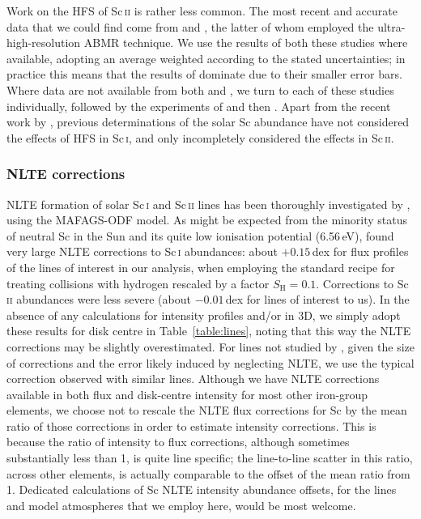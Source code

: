 \documentclass[traditabstract]{aa}
\newcommand{\altsci}{Sc\,\textsc{i}}
\newcommand{\altscii}{Sc\,\textsc{ii}}
\begin{document}
Work on the HFS of Sc\,\textsc{ii} is rather less common.  The most recent and accurate data that we could find come from
\citet{Villemoes92} and \citet{Mansour89}, the latter of whom employed the ultra-high-resolution ABMR technique.
We use the results of both these studies where available, adopting an average weighted according to the stated
uncertainties; in practice this means that the results of \citet{Mansour89} dominate due to their smaller error
 bars.  Where data are not available from both \citet{Villemoes92} and \citet{Mansour89}, we turn to each of these studies individually, followed by the experiments of \citet{Young88} and then \citet{Arnesen82}.  Apart from
the recent work by \citet{Zhang08}, previous determinations of the solar Sc abundance have not considered 
the effects of HFS in \altsci, and only incompletely considered the effects in \altscii.

\subsubsection{NLTE corrections}
\label{ScNLTE}

NLTE formation of solar Sc\,\textsc{i} and Sc\,\textsc{ii} lines has
been thoroughly investigated by \citet{Zhang08},
using the MAFAGS-ODF model.  As might be expected from the minority
status of neutral Sc in the Sun and its quite low ionisation potential
(6.56\,eV), \citet{Zhang08} found very large NLTE corrections to
Sc\,\textsc{i} abundances: about $+0.15$\,dex for flux profiles of the lines of interest in our analysis, when employing the standard \citet{Drawin69} recipe for treating collisions with hydrogen rescaled by a factor $S_\mathrm{H}=0.1$. Corrections to Sc\,\textsc{ii} abundances were less severe (about $-0.01$\,dex for lines of interest to us).  In the absence of any calculations for intensity profiles and/or in 3D, we simply adopt these results for disk centre in Table~\ref{table:lines}, noting that this way the NLTE corrections may be slightly overestimated.  For lines not studied by \citet{Zhang08}, given the size of corrections and the error likely induced by neglecting NLTE, we use the typical correction observed with similar lines.  Although we have NLTE corrections available in both flux and disk-centre intensity for most other iron-group elements, we choose not to rescale the NLTE flux corrections for Sc by the mean ratio of those corrections in order to estimate intensity corrections.  This is because the ratio of intensity to flux corrections, although sometimes substantially less than 1, is quite line specific; the line-to-line scatter in this ratio, across other elements, is actually comparable to the offset of the mean ratio from 1.  Dedicated calculations of Sc NLTE intensity abundance offsets, for the lines and model atmospheres that we employ here, would be most welcome.
\end{document}
